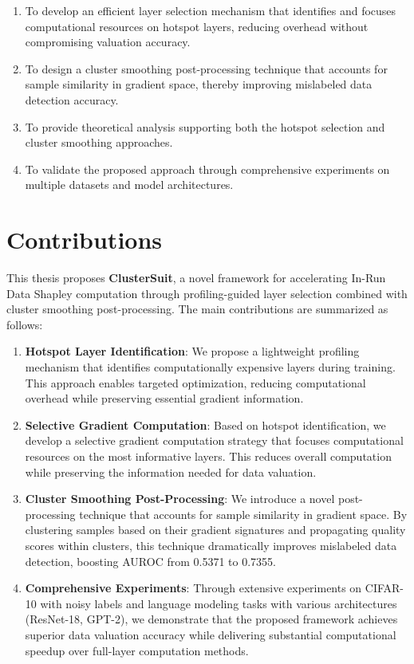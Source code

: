 \documentclass[12pt,a4paper]{report}
\begin{document}
\begin{enumerate}
    \item To develop an efficient layer selection mechanism that identifies and focuses computational resources on hotspot layers, reducing overhead without compromising valuation accuracy.
    
    \item To design a cluster smoothing post-processing technique that accounts for sample similarity in gradient space, thereby improving mislabeled data detection accuracy.
    
    \item To provide theoretical analysis supporting both the hotspot selection and cluster smoothing approaches.
    
    \item To validate the proposed approach through comprehensive experiments on multiple datasets and model architectures.
\end{enumerate}

\section{Contributions}
\label{sec:contributions}

This thesis proposes \textbf{ClusterSuit}, a novel framework for accelerating In-Run Data Shapley computation through profiling-guided layer selection combined with cluster smoothing post-processing. The main contributions are summarized as follows:

\begin{enumerate}
    \item \textbf{Hotspot Layer Identification}: We propose a lightweight profiling mechanism that identifies computationally expensive layers during training. This approach enables targeted optimization, reducing computational overhead while preserving essential gradient information.
    
    \item \textbf{Selective Gradient Computation}: Based on hotspot identification, we develop a selective gradient computation strategy that focuses computational resources on the most informative layers. This reduces overall computation while preserving the information needed for data valuation.
    
    \item \textbf{Cluster Smoothing Post-Processing}: We introduce a novel post-processing technique that accounts for sample similarity in gradient space. By clustering samples based on their gradient signatures and propagating quality scores within clusters, this technique dramatically improves mislabeled data detection, boosting AUROC from 0.5371 to 0.7355.
    
    \item \textbf{Comprehensive Experiments}: Through extensive experiments on CIFAR-10 with noisy labels and language modeling tasks with various architectures (ResNet-18, GPT-2), we demonstrate that the proposed framework achieves superior data valuation accuracy while delivering substantial computational speedup over full-layer computation methods.
\end{enumerate}
\end{document}
